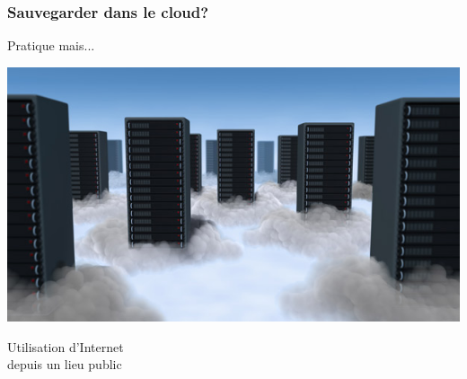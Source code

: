 \documentclass{beamer}
\begin{document}
\begin{frame}
\frametitle{Sauvegarder dans le cloud?}

\begin{block}{Pratique mais...}
\begin{itemize}
\end{itemize}
\end{block}

\begin{center}
\includegraphics[scale=0.4] {./images/cloud_data_center.jpg}
\end{center}

\end{frame}

\begin{frame}
\begin{center}
\Huge{Utilisation d'Internet \\depuis un lieu public}
\end{center}
\end{frame}
\end{document}
